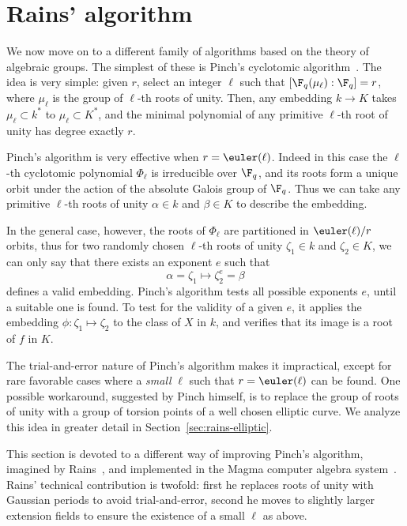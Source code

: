 \section{Rains' algorithm}
\label{sec:rains-algorithm}

We now move on to a different family of algorithms based on the theory of
algebraic groups. The simplest of these is Pinch's
cyclotomic algorithm~\cite{Pinch}. The idea is very simple: given $r$,
select an integer $\ell$ such that $[\F_q(\mu_\ell):\F_q]=r$, where
$\mu_\ell$ is the group of $\ell$-th roots of unity.  Then, any
embedding $k\to K$ takes $\mu_\ell\subset k^\ast$ to $\mu_\ell\subset
K^\ast$, and the minimal polynomial of any primitive $\ell$-th root of
unity has degree exactly $r$.

Pinch's algorithm is very effective when $r=\euler(\ell)$. Indeed in
this case the $\ell$-th cyclotomic polynomial $\Phi_\ell$ is
irreducible over $\F_q$, and its roots form a unique orbit under the
action of the absolute Galois group of $\F_q$. Thus we can take any
primitive $\ell$-th roots of unity $\alpha\in k$ and $\beta\in K$ to
describe the embedding.

In the general case, however, the roots of $\Phi_\ell$ are partitioned
in $\euler(\ell)/r$ orbits, thus for two randomly chosen $\ell$-th
roots of unity $\zeta_1\in k$ and $\zeta_2\in K$, we can only say that
there exists an exponent $e$ such that
\begin{equation*}
  \alpha = \zeta_1 \mapsto \zeta_2^e = \beta
\end{equation*}
defines a valid embedding. Pinch's algorithm tests all possible
exponents $e$, until a suitable one is found. To test for the validity
of a given $e$, it applies the embedding $\phi:\zeta_1\mapsto\zeta_2$
to the class of $X$ in $k$, and verifies that its image is a root of
$f$ in $K$.

The trial-and-error nature of Pinch's algorithm makes it impractical,
except for rare favorable cases where a \emph{small} $\ell$ such that
$r=\euler(\ell)$ can be found. One possible workaround, suggested by
Pinch himself, is to replace the group of roots of unity with a group
of torsion points of a well chosen elliptic curve. We analyze this
idea in greater detail in Section~\ref{sec:rains-elliptic}.

This section is devoted to a different way of improving Pinch's
algorithm, imagined by Rains~\cite{rains2008}, and implemented in the
Magma computer algebra system~\cite{MAGMA}. Rains' technical
contribution is twofold: first he replaces roots of unity with
Gaussian periods to avoid trial-and-error, second he moves to slightly
larger extension fields to ensure the existence of a small $\ell$ as
above.

